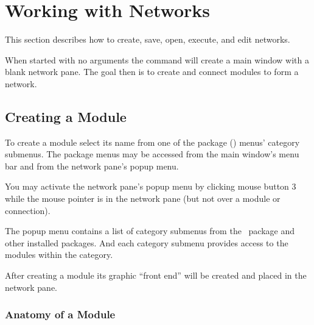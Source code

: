 %

  \newcommand{\modgraphic}%
  {\centerline{\epsfig{file=figures/modgraphic.eps,width=2in}}}
\begin{htmlonly}
  \newcommand{\srwindow}{%
  \htmladdimg[align=top,width="90%
  {../figures/modgraphic.gif}}
\end{htmlonly}

  \newcommand{\moddialog}%
  {\centerline{\epsfig{file=figures/moddialog.eps,width=3in}}}
\begin{htmlonly}
  \newcommand{\srwindow}{%
  \htmladdimg[align=top,width="90%
  {../figures/moddialog.gif}}
\end{htmlonly}

\section{Working with Networks}
\label{sec:workwithnets}

This section describes how to create, save, open, execute, and edit
networks.

When started with no arguments the  command will create a
main window with a blank network pane.  The goal then is to create and
connect modules to form a network.


\subsection{Creating a Module}
\label{sec:creatingmodules}

To create a module select its name from one of the package (\eg \sr)
menus' category submenus.  The package menus may be accessed from the main
window's menu bar and from the network pane's popup menu.

You may activate the network pane's popup menu by clicking mouse button 3
while the mouse pointer is in the network pane (but not over a module or
connection).  

The popup menu contains a list of category submenus from the \sr\ package
and other installed packages.  And each category submenu provides
access to the modules within the category.

After creating a module its graphic ``front end'' will be created and
placed in the network pane.

\subsubsection{Anatomy of a Module}
\label{sec:modanatomy}

